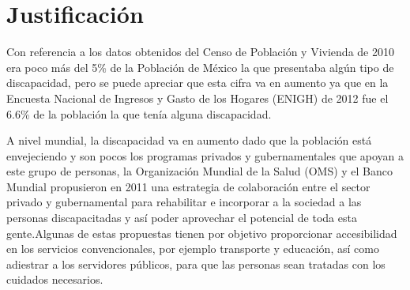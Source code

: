
\section{Justificaci\'on}




 Con referencia a los datos obtenidos del Censo de Poblaci\'on
 y Vivienda de 2010 era poco m\'as del 5\% de la Poblaci\'on de M\'exico la 
 que presentaba alg\'un tipo de discapacidad, pero se puede apreciar que esta 
 cifra va en aumento ya que en la Encuesta Nacional de Ingresos y Gasto de 
 los Hogares (ENIGH) de 2012 fue el 6.6\% de la poblaci\'on la que ten\'ia 
 alguna discapacidad\cite{Milosavljevic2014}.

A nivel mundial, la discapacidad va en aumento dado que la poblaci\'on est\'a
 envejeciendo y son pocos los programas privados y gubernamentales que apoyan 
 a este grupo de personas\cite{OrganizacionMundialdelaSalud2011}, la
 Organizaci\'on Mundial de la Salud (OMS) y el Banco Mundial
 propusieron en 2011 \cite{OrganizacionMundialdelaSalud2011} una
 estrategia de colaboraci\'on entre el sector privado y gubernamental para
 rehabilitar e incorporar a la sociedad a las personas discapacitadas y as\'i
 poder aprovechar el potencial de toda esta gente.Algunas de estas propuestas
 tienen por objetivo proporcionar accesibilidad en los servicios 
 convencionales, por ejemplo transporte y educaci\'on, as\'i como adiestrar a 
 los servidores p\'ublicos, para que las personas sean tratadas con los 
 cuidados necesarios.
 
